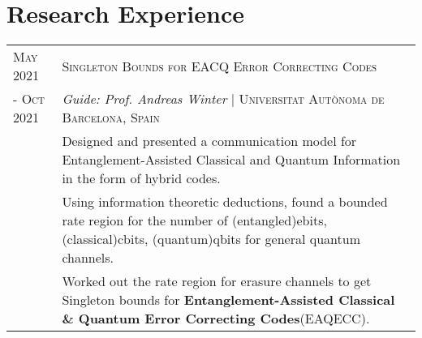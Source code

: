 \documentclass[a4paper,10pt]{article}
\begin{document}
\section{Research Experience}
\begin{tabular}{p{1.8cm}|p{15.3cm}}
	\centering \textsc{May 2021}& \textsc{Singleton Bounds for EACQ Error Correcting Codes} 
	\\ \centering \textsc{- Oct 2021}&\emph{Guide: Prof. Andreas Winter} | \small{\textsc{Universitat Aut\`onoma de Barcelona, Spain}} \\&\footnotesize{ Designed and presented a communication model for Entanglement-Assisted Classical and Quantum Information in the form of hybrid codes.} \\
	&\footnotesize{ Using information theoretic deductions, found a bounded rate region for the number of (entangled)ebits, (classical)cbits, (quantum)qbits for general quantum channels.}\\
	&\footnotesize{ Worked out the rate region for erasure channels to get Singleton bounds for \textbf{Entanglement-Assisted Classical \& Quantum Error Correcting Codes}(EAQECC).}
	\\
\end{tabular}
\end{document}
